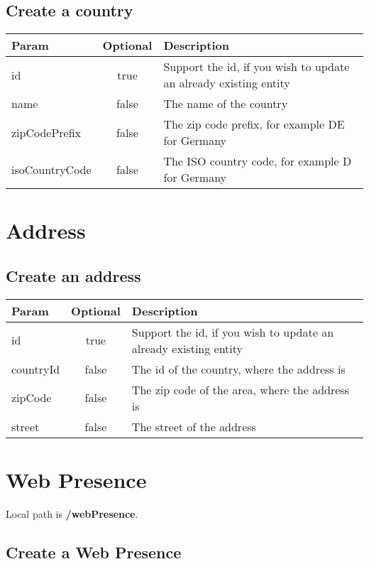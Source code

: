 \documentclass[a4paper,10pt]{book}
\newcommand{\thead}[1]{\textbf{\large{#1}}}
\begin{document}
\subsection{Create a country}
\label{s:ccountry}

\begin{tabular}{l | c | l}
\thead{Param} & \thead{Optional} & \thead{Description}\\
\hline
id & true & Support the id, if you wish to update an already existing entity\\
name & false & The name of the country \\
zipCodePrefix & false & The zip code prefix, for example DE for Germany \\
isoCountryCode & false & The ISO country code, for example D for Germany
 
\end{tabular} 

\section{Address}
\label{sec:address}

\subsection{Create an address}
\label{s:caddress}

\begin{tabular}{l | c | l}
\thead{Param} & \thead{Optional} & \thead{Description}\\
\hline
id & true & Support the id, if you wish to update an already existing entity\\
countryId & false & The id of the country, where the address is\\
zipCode & false & The zip code of the area, where the address is \\
street & false & The street of the address \\
 
\end{tabular} 


\section{Web Presence}
\label{sec:WebPresence}

Local path is \textbf{/webPresence}.

\subsection{Create a Web Presence}
\label{s:cWebPresence}
\end{document}
